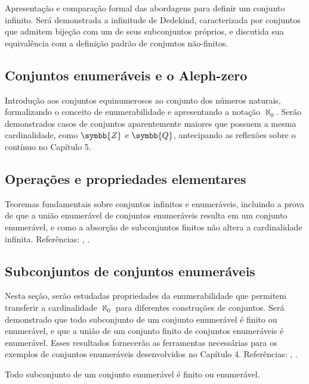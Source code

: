 Apresentação e comparação formal das abordagens para definir um conjunto infinito. Será demonstrada a infinitude de Dedekind, caracterizada por conjuntos que admitem bijeção com um de seus subconjuntos próprios, e discutida sua equivalência com a definição padrão de conjuntos não-finitos.

\subsection{Conjuntos enumeráveis e o Aleph-zero}
\label{subsec:enumeraveis_aleph_zero}

Introdução aos conjuntos equinumerosos ao conjunto dos números naturais, formalizando o conceito de enumerabilidade e apresentando a notação \(\aleph_0\). Serão demonstrados casos de conjuntos aparentemente maiores que possuem a mesma cardinalidade, como \(\symbb{Z}\) e \(\symbb{Q}\), antecipando as reflexões sobre o contínuo no Capítulo 5.

\subsection{Operações e propriedades elementares}
\label{subsec:operacoes_infinitos}

Teoremas fundamentais sobre conjuntos infinitos e enumeráveis, incluindo a prova de que a união enumerável de conjuntos enumeráveis resulta em um conjunto enumerável, e como a absorção de subconjuntos finitos não altera a cardinalidade infinita. Referências: \cite{suppes1972}, \cite{enderton1977}.

\subsection{Subconjuntos de conjuntos enumeráveis}
\label{subsec:subconjuntos_enumeraveis}

Nesta seção, serão estudadas propriedades da enumerabilidade que permitem transferir a cardinalidade \(\aleph_0\) para diferentes construções de conjuntos. Será demonstrado que todo subconjunto de um conjunto enumerável é finito ou enumerável, e que a união de um conjunto finito de conjuntos enumeráveis é enumerável. Esses resultados fornecerão as ferramentas necessárias para os exemplos de conjuntos enumeráveis desenvolvidos no Capítulo 4. Referências:
\cite{suppes1972}, \cite{enderton1977}.

\begin{proposicao}
    \label{prop:subconjunto_enumeravel}
    Todo subconjunto de um conjunto enumerável é finito ou enumerável.
\end{proposicao}

